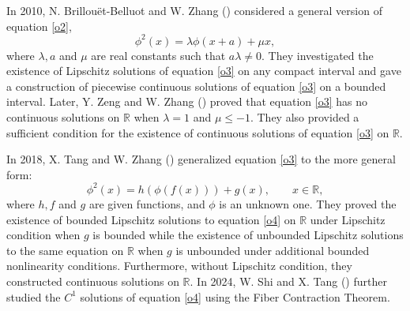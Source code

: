 \documentclass[11pt,reqno,a4paper]{amsart}
\numberwithin{equation}{section}
\begin{document}
In 2010, N. Brillou\"{e}t-Belluot and W. Zhang (\cite{BB2}) considered a general version of equation \eqref{o2},
\begin{equation}\label{o3}
    \phi^2(x) = \lambda\phi(x+a) + \mu x, 
\end{equation}
where $\lambda, a$ and $\mu$ are real constants such that $a\lambda \neq 0$. 
They investigated the existence of Lipschitz solutions of equation \eqref{o3} on any compact interval and gave a construction of piecewise continuous solutions of equation \eqref{o3} on a bounded interval. Later, Y. Zeng and W. Zhang (\cite{ZY}) proved that equation \eqref{o3} has no continuous solutions on $\mathbb{R}$ when $\lambda=1$ and $\mu \le -1$. They also provided a sufficient condition for the existence of continuous solutions of equation \eqref{o3} on $\mathbb{R}$.

In 2018, X. Tang and W. Zhang (\cite{TX}) generalized equation \eqref{o3} to the more general form:
\begin{equation}\label{o4}
    \phi^2(x) = h(\phi(f(x))) +g(x), \qquad x\in \mathbb{R},
\end{equation}
where $h, f$ and $g$ are given functions, and $\phi$ is an unknown one. 
They proved the existence of bounded Lipschitz solutions to equation \eqref{o4} on $\mathbb{R}$ under Lipschitz condition when $g$ is bounded while the existence of unbounded Lipschitz solutions to the same equation on  $\mathbb{R}$ when $g$ is unbounded under additional bounded nonlinearity conditions.
Furthermore, without Lipschitz condition, they constructed continuous solutions on  $\mathbb{R}$.
In 2024, W. Shi and X. Tang (\cite{tx}) further studied the $C^1$ solutions of equation \eqref{o4} using the Fiber Contraction Theorem.
\end{document}
